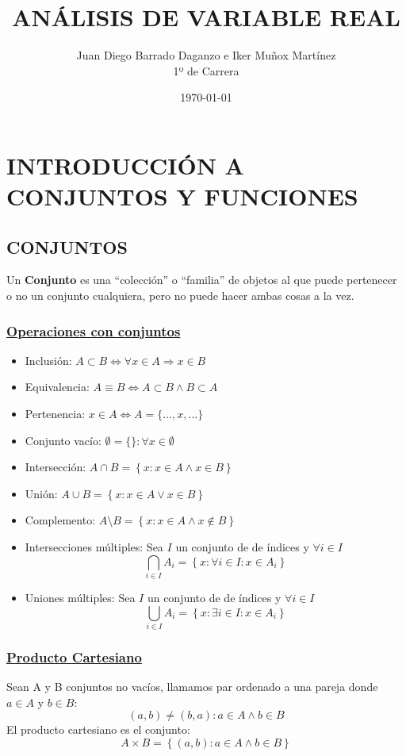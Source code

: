 \documentclass[10pt,a4paper,openright]{book}
\title{ANÁLISIS DE VARIABLE REAL}
\author{Juan Diego Barrado Daganzo e Iker Muñox Martínez\\1º de Carrera} %
\date{\today}
\begin{document}
\maketitle

\mainmatter
\chapter*{INTRODUCCIÓN A CONJUNTOS Y FUNCIONES}
\section*{CONJUNTOS}
Un \textbf{Conjunto} es una ``colección'' o ``familia'' de objetos al que puede pertenecer o no un conjunto cualquiera, pero no puede hacer ambas cosas a la vez.
\subsection*{\underline{Operaciones con conjuntos}}
\begin{itemize}
\item Inclusión: $A\subset B \Leftrightarrow \forall x \in A \Rightarrow x \in B$
\item Equivalencia: $A \equiv B \Leftrightarrow A \subset B \wedge B \subset A$
\item Pertenencia: $x \in A \Leftrightarrow A=\{...,x,...\}$
\item Conjunto vacío: $\emptyset=\{\}: \forall x \in \emptyset$
\item Intersección: $A \cap B=\left\lbrace x: x\in A \wedge x\in B \right\rbrace$
\item Unión: $A \cup B=\left\lbrace x: x\in A \vee x\in B \right\rbrace$
\item Complemento: $A \mbox{\textbackslash} B=\left\lbrace x: x\in A \wedge x\notin B \right\rbrace$
\item Intersecciones múltiples: Sea $I$ un conjunto de de índices y $\forall i \in I$
$$\bigcap_{i\in I}A_i=\left\lbrace x: \forall i \in I : x\in A_i\right\rbrace$$
\item Uniones múltiples: Sea $I$ un conjunto de de índices y $\forall i \in I$
$$\bigcup_{i\in I}A_i=\left\lbrace x: \exists i \in I: x\in A_i\right\rbrace$$
\end{itemize}

\subsection*{\underline{Producto Cartesiano}}
Sean A y B conjuntos no vacíos, llamamos par ordenado a una pareja donde $a \in A$ y $b \in B$:
$$(a,b)\neq (b,a) : a\in A \wedge b\in B$$
El producto cartesiano es el conjunto:
$$A\times B=\left\lbrace (a,b) : a \in A \wedge b \in B\right\rbrace$$
\end{document}
